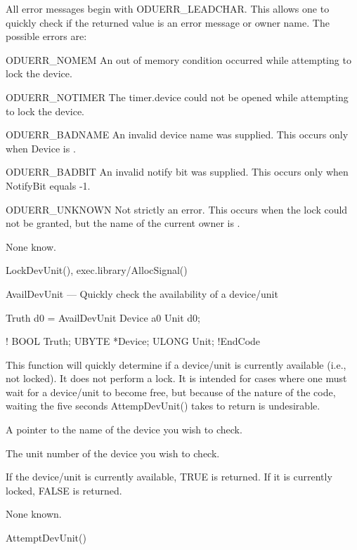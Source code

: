 All error messages begin with {\TT ODUERR\_LEADCHAR}.  This allows one to
quickly check if the returned value is an error message or owner name.  The
possible errors are:

\Item ODUERR\_NOMEM
An out of memory condition occurred while attempting to lock the device.

\Item ODUERR\_NOTIMER
The timer.device could not be opened while attempting to lock the device.

\Item ODUERR\_BADNAME
An invalid device name was supplied.  This occurs only when {\TT Device} is
\NULL.

\Item ODUERR\_BADBIT
An invalid notify bit was supplied.  This occurs only when {\TT NotifyBit}
equals -1.

\Item ODUERR\_UNKNOWN
Not strictly an error.  This occurs when the lock could not be granted, but
the name of the current owner is \NULL.

None know.

{\TT LockDevUnit()},
{\TT exec.library/AllocSignal()}


AvailDevUnit --- Quickly check the availability of a device/unit

\Synopsis Truth d0 = AvailDevUnit Device a0 Unit d0;

\BeginCode!
BOOL     Truth;
UBYTE   *Device;
ULONG    Unit;
!EndCode

This function will quickly determine if a device/unit is currently
available (i.e., not locked).  It does not perform a lock.  It is intended
for cases where one must wait for a device/unit to become free, but because
of the nature of the code, waiting the five seconds {\TT AttempDevUnit()}
takes to return is undesirable.

A pointer to the name of the device you wish to check.
\EndSub

The unit number of the device you wish to check.

If the device/unit is currently available, {\TT TRUE} is returned.  If it
is currently locked, {\TT FALSE} is returned.

None known.

{\TT AttemptDevUnit()}


